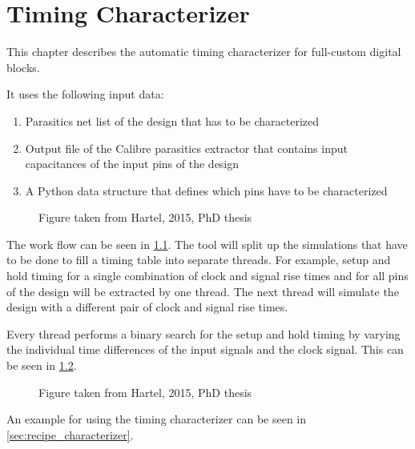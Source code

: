 \chapter{Timing Characterizer}
\label{chap:timing_characterizer}

This chapter describes the automatic timing characterizer for full-custom
digital blocks.

It uses the following input data:
\begin{enumerate}
	\item Parasitics net list of the design that has to be characterized
	\item Output file of the Calibre parasitics extractor that contains input
		capacitances of the input pins of the design
	\item A Python data structure that defines which pins have to be
		characterized
\end{enumerate}

\begin{figure}
	\centering
	
	\caption{Figure taken from Hartel, 2015, PhD thesis}
	\label{fig:workflow_characterizer}
\end{figure}

The work flow can be seen in \cref{fig:workflow_characterizer}.
The tool will split up the simulations that have to be done to fill a timing
table into separate threads. For example, setup and hold timing for a single
combination of clock and signal rise times and for all pins of the design will
be extracted by one thread. The next thread will simulate the design with a
different pair of clock and signal rise times.

Every thread performs a binary search for the setup and hold timing by varying
the individual time differences of the input signals and the clock signal. This
can be seen in \cref{fig:binary_search_characterizer}.

\begin{figure}
	\centering
	
	\caption{Figure taken from Hartel, 2015, PhD thesis}
	\label{fig:binary_search_characterizer}
\end{figure}

An example  for using the timing characterizer can be seen in
\cref{sec:recipe_characterizer}.
